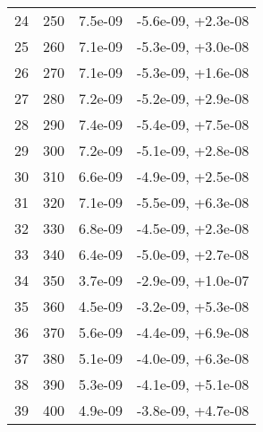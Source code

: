\begin{table}
\begin{adjustbox}{width=1\textwidth/2}
\begin{tabular}{|c|c|c|c|}
\cline{1-4}
24 & 250 & 7.5e-09 & -5.6e-09, +2.3e-08 \\
\cline{1-4}
25 & 260 & 7.1e-09 & -5.3e-09, +3.0e-08 \\
\cline{1-4}
26 & 270 & 7.1e-09 & -5.3e-09, +1.6e-08 \\
\cline{1-4}
27 & 280 & 7.2e-09 & -5.2e-09, +2.9e-08 \\
\cline{1-4}
28 & 290 & 7.4e-09 & -5.4e-09, +7.5e-08 \\
\cline{1-4}
29 & 300 & 7.2e-09 & -5.1e-09, +2.8e-08 \\
\cline{1-4}
30 & 310 & 6.6e-09 & -4.9e-09, +2.5e-08 \\
\cline{1-4}
31 & 320 & 7.1e-09 & -5.5e-09, +6.3e-08 \\
\cline{1-4}
32 & 330 & 6.8e-09 & -4.5e-09, +2.3e-08 \\
\cline{1-4}
33 & 340 & 6.4e-09 & -5.0e-09, +2.7e-08 \\
\cline{1-4}
34 & 350 & 3.7e-09 & -2.9e-09, +1.0e-07 \\
\cline{1-4}
35 & 360 & 4.5e-09 & -3.2e-09, +5.3e-08 \\
\cline{1-4}
36 & 370 & 5.6e-09 & -4.4e-09, +6.9e-08 \\
\cline{1-4}
37 & 380 & 5.1e-09 & -4.0e-09, +6.3e-08 \\
\cline{1-4}
38 & 390 & 5.3e-09 & -4.1e-09, +5.1e-08 \\
\cline{1-4}
39 & 400 & 4.9e-09 & -3.8e-09, +4.7e-08 \\
\cline{1-4}
\end{tabular}
\end{adjustbox}
\end{table}

